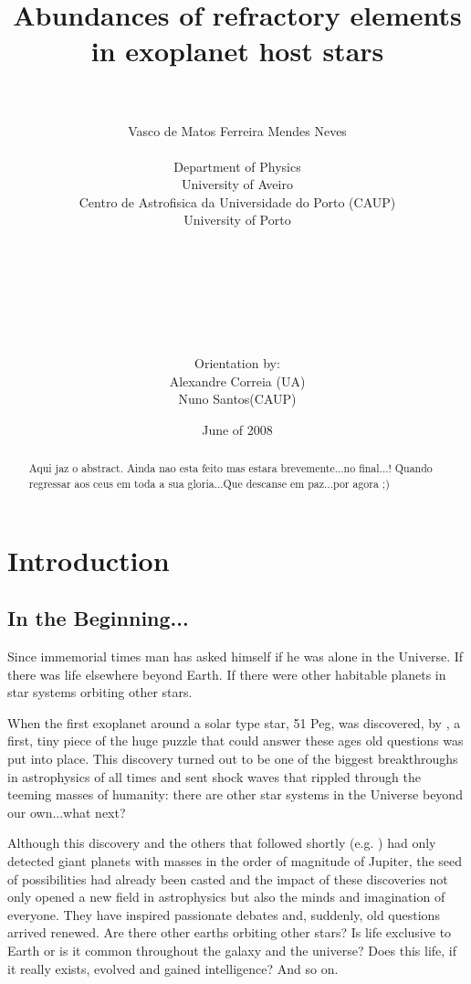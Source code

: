 \documentclass[dvips,12pt,a4paper]{report}
\title{Abundances of refractory elements in exoplanet host stars}
\author{\\
\\
Vasco de Matos Ferreira Mendes Neves \\ [4mm]
\\
Department of Physics \\
University of Aveiro \\
Centro de Astrofisica da Universidade do Porto (CAUP) \\
University of Porto
\\
\\
\\
\\
\\
\\
\\
\\
Orientation by:\\
Alexandre Correia (UA) \\ Nuno Santos(CAUP)}
\date{June of 2008}
\begin{document}
\maketitle
\begin{abstract}
 Aqui jaz o abstract. Ainda nao esta feito mas estara brevemente...no final...! Quando regressar aos ceus em toda a sua gloria...Que descanse em paz...por agora ;)
\end{abstract}
\newpage
\tableofcontents
\newpage



\chapter{Introduction}

\section{In the Beginning...}

\indent Since immemorial times man has asked himself if he was alone in the Universe. If there was life elsewhere beyond Earth. If there were other habitable planets in star systems orbiting other stars.

When the first exoplanet around a solar type star, 51 Peg, was discovered, by \citet{Mayor-1995}, %
a first, tiny piece of the huge puzzle that could answer these ages old questions was put into place. This discovery turned out to be one of the biggest breakthroughs in astrophysics of all times and sent shock waves that rippled through the teeming masses of humanity: there are other star systems in the Universe beyond our own...what next?

\indent Although this discovery and the others that followed shortly (e.g. \citeauthor{Marcy-1996} \citeyear{Marcy-1996}) had only detected giant planets with masses in the order of magnitude of Jupiter, the seed of possibilities had already been casted and the impact of these discoveries not only  opened a new field in astrophysics but also the minds and imagination of everyone. They have inspired passionate debates and, suddenly, old questions arrived renewed. Are there other earths orbiting other stars? Is life exclusive to Earth or is it common throughout the galaxy and the universe? Does this life, if it really exists, evolved and gained intelligence? And so on. 
\end{document}
